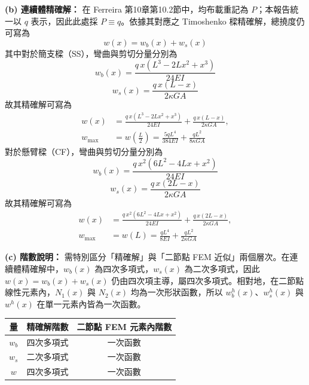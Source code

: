 ﻿\documentclass[UTF8, a4paper, 12pt]{ctexart}
\begin{document}
\textbf{(b) 連續體精確解：}
在 Ferreira 第10章第10.2節中，均布載重記為 $P$；本報告統一以 $q$ 表示，因此此處採 $P\equiv q$。依據其對應之 Timoshenko 樑精確解，總撓度仍可寫為
\begin{equation}
  w(x)=w_b(x)+w_s(x)
\end{equation}
其中對於簡支樑（SS），彎曲與剪切分量分別為
\begin{equation}
  w_b(x)=\frac{q\,x\left(L^3-2Lx^2+x^3\right)}{24EI}
\end{equation}
\begin{equation}
  w_s(x)=\frac{q\,x(L-x)}{2\kappa GA}
\end{equation}
故其精確解可寫為
\begin{equation}
  \begin{aligned}
    w(x)&=\frac{q\,x\left(L^3-2Lx^2+x^3\right)}{24EI}
    +\frac{q\,x(L-x)}{2\kappa GA}, \\
    w_{\max}&=w\!\left(\frac{L}{2}\right)
    =\frac{5qL^4}{384EI}+\frac{qL^2}{8\kappa GA}
  \end{aligned}
\end{equation}
對於懸臂樑（CF），彎曲與剪切分量分別為
\begin{equation}
  w_b(x)=\frac{q\,x^2\left(6L^2-4Lx+x^2\right)}{24EI}
\end{equation}
\begin{equation}
  w_s(x)=\frac{q\,x(2L-x)}{2\kappa GA}
\end{equation}
故其精確解可寫為
\begin{equation}
  \begin{aligned}
    w(x)&=\frac{q\,x^2\left(6L^2-4Lx+x^2\right)}{24EI}
    +\frac{q\,x(2L-x)}{2\kappa GA}, \\
    w_{\max}&=w(L)
    =\frac{qL^4}{8EI}+\frac{qL^2}{2\kappa GA}
  \end{aligned}
\end{equation}

\textbf{(c) 階數說明：}
需特別區分「精確解」與「二節點 FEM 近似」兩個層次。在連續體精確解中，$w_b(x)$ 為四次多項式，$w_s(x)$ 為二次多項式，因此 $w(x)=w_b(x)+w_s(x)$ 仍由四次項主導，屬四次多項式。相對地，在二節點線性元素內，$N_1(x)$ 與 $N_2(x)$ 均為一次形狀函數，所以 $w_b^h(x)$、$w_s^h(x)$ 與 $w^h(x)$ 在單一元素內皆為一次函數。

\begin{center}
\begin{tabular}{ccc}
\toprule
\textbf{量} & \textbf{精確解階數} & \textbf{二節點 FEM 元素內階數} \\
\midrule
$w_b$ & 四次多項式 & 一次函數 \\
$w_s$ & 二次多項式 & 一次函數 \\
$w$   & 四次多項式 & 一次函數 \\
\bottomrule
\end{tabular}
\end{center}
\end{document}
